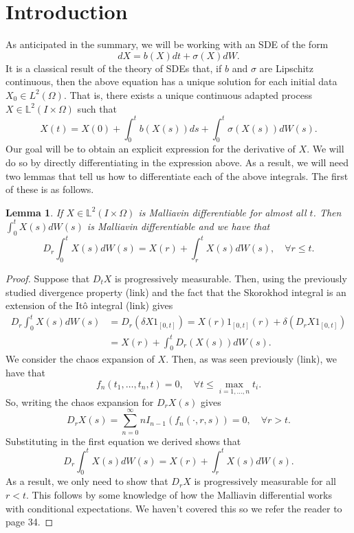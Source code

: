 \documentclass[12pt]{article}
\newtheorem{lemma}{Lemma}
\begin{document}
\section{Introduction}
As anticipated in the summary, we will be working with an SDE of the form
\begin{equation}\label{SDE}
	dX=b(X) d t +\sigma (X)dW .
\end{equation}
It is a classical result of the theory of SDEs that, if $b$ and  $\sigma $ are Lipschitz continuous, then the above equation has a unique solution for each initial data $X_0\in L^2(\Omega)$. That is, there exists a unique continuous adapted process $X\in \mathbb{L}^2(I\times\Omega)$ such that
\begin{equation}\label{X expression}
	X(t)=X(0)+\int_{0}^t b(X(s)) ds+\int_{0}^t \sigma(X(s))  dW(s).
\end{equation}
Our goal will be to obtain an explicit expression for the derivative of $X$. We will do so by directly differentiating in the expression above. As a result, we will need two lemmas that tell us how to differentiate each of the above integrals. The first of these is as follows.
\begin{lemma}
	If $X\in \mathbb{L}^2(I\times\Omega)$ is  Malliavin differentiable for almost all $t$. Then $\int_{0}^t X(s) dW(s)$ is Malliavin differentiable and we have that
	\begin{equation*}
		D_r \int_{0}^t X(s) dW(s)=X(r)+\int_{r}^t X(s) dW(s), \quad\forall r\leq t.
	\end{equation*}
\end{lemma}
\begin{proof}
	Suppose that $D_tX$ is progressively measurable. Then, using the previously studied divergence property (link) and the fact that the Skorokhod integral is an extension of the Itô integral (link) gives
	\begin{align*}
		D_r \int_{0}^t X(s) dW(s) & =D_r(\delta X1_{[0,t]}) =X(r)1_{[0,t]}(r)+\delta (D_rX1_{[0,t]}) \\&=X(r)+\int_{0}^t D_r(X(s)) dW(s).
	\end{align*}
	We consider the chaos expansion of $X$. Then, as was seen previously (link), we have that
	\begin{equation*}
		f_n(t_1,\ldots,t_n,t)=0,\quad\forall t\leq\max_{i=1,\ldots,n} t_i .
	\end{equation*}
	So, writing the chaos expansion for $D_rX(s)$  gives
	\begin{equation*}
		D_rX(s)=\sum_{n=0}^{\infty}  nI_{n-1}(f_n(\cdot ,r,s))=0, \quad\forall r>t.
	\end{equation*}
	Substituting in the first equation we derived shows that
	\begin{equation*}
		D_r \int_{0}^t X(s) dW(s)=X(r)+\int_{r}^t X(s) dW(s).
	\end{equation*}
	As a result, we only need to show that $D_r X$ is progressively measurable for all $r<t$.	This follows by some knowledge of how the Malliavin differential works with conditional expectations. We haven't covered this so we refer the reader to \cite{nunno2008malliavin} page 34.
\end{proof}
\end{document}
